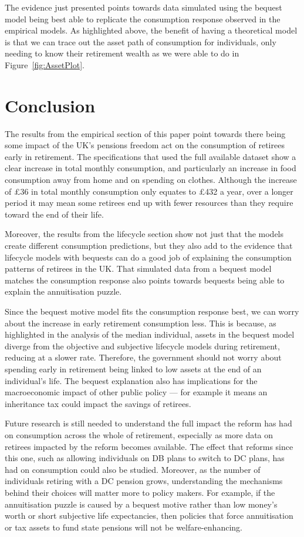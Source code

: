 \documentclass[12pt]{article}
\begin{document}
The evidence just presented points towards data simulated using the bequest
model being best able to replicate the consumption response observed in the
empirical models. As highlighted above, the benefit of having a theoretical
model is that we can trace out the asset path of consumption for individuals,
only needing to know their retirement wealth as we were able to do in
Figure~\ref{fig:AssetPlot}.

\section{Conclusion}

The results from the empirical section of this paper point towards there being
some impact of the UK's pensions freedom act on the consumption of retirees
early in retirement. The specifications that used the full available dataset
show a clear increase in total monthly consumption, and particularly an increase
in food consumption away from home and on spending on clothes. Although the
increase of £36 in total monthly consumption only equates to £432 a year, over
a longer period it may mean some retirees end up with fewer resources than they
require toward the end of their life.

Moreover, the results from the lifecycle section show not just that the models
create different consumption predictions, but they also add to the evidence that
lifecycle models with bequests can do a good job of explaining the consumption
patterns of retirees in the UK. That simulated data from a bequest model matches
the consumption response also points towards bequests being able to explain the
annuitisation puzzle.

Since the bequest motive model fits the consumption response best, we can worry
about the increase in early retirement consumption less. This is because, as
highlighted in the analysis of the median individual, assets in the bequest model
diverge from the objective and subjective lifecycle models during retirement,
reducing at a slower rate. Therefore, the government should not worry about
spending early in retirement being linked to low assets at the end of an
individual's life. The bequest explanation also has implications for the
macroeconomic impact of other public policy --- for example it means an
inheritance tax could impact the savings of retirees.

Future research is still needed to understand the full impact the reform has had
on consumption across the whole of retirement, especially as more data on
retirees impacted by the reform becomes available. The effect that reforms since
this one, such as allowing individuals on DB plans to switch to DC plans, has
had on consumption could also be studied. Moreover, as the number of individuals
retiring with a DC pension grows, understanding the mechanisms
behind their choices will matter more to policy makers. For example, if the
annuitisation puzzle is caused by a bequest motive rather than low money's worth
or short subjective life expectancies, then policies that force annuitisation or
tax assets to fund state pensions will not be welfare-enhancing.


\printbibliography
% 
\end{document}

